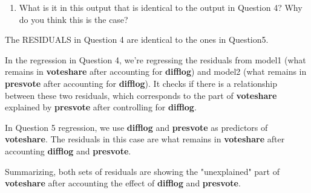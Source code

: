\documentclass[12pt,letterpaper]{article}
\begin{document}
\begin{enumerate}
		
		

		
		
		
		
		\item What is it in this output that is identical to the output in Question 4? Why do you think this is the case?
	\end{enumerate}
	\vspace{.50cm}

		The RESIDUALS in Question 4 are identical to the ones in Question5. 
		\vspace{.25cm}
		
		In the regression in Question 4, we're regressing the residuals from model1 (what remains in \textbf{voteshare} after accounting for \textbf{difflog}) and model2 (what remains in \textbf{presvote} after accounting for \textbf{difflog}). 
		It checks if there is a relationship between these two residuals, which corresponds to the part of \textbf{voteshare} explained by \textbf{presvote} after controlling for \textbf{difflog}.
		\vspace{.25cm}

		In Question 5 regression, we use \textbf{difflog} and \textbf{presvote} as predictors of \textbf{voteshare}. The residuals in this case are what remains in \textbf{voteshare} after accounting \textbf{difflog} and \textbf{presvote}. 
		\vspace{.25cm}
		
		Summarizing, both sets of residuals are showing the "unexplained" part of \textbf{voteshare} after accounting the effect of \textbf{difflog} and \textbf{presvote}.
\end{document}
